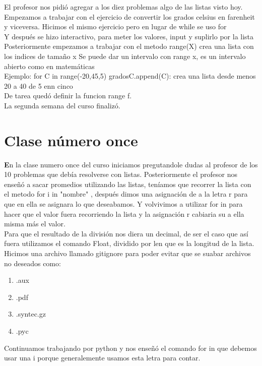 \documentclass{book}
\begin{document}
\begin{enumerate}
\begin{enumerate}
El profesor nos pidió agregar a los diez problemas algo de las listas visto hoy.\\
Empezamos a trabajar con el ejercicio de convertir los grados celsius en farenheit y viceversa. Hicimos el mismo ejercicio pero en lugar de while se uso for \\
Y después se hizo interactivo, para meter los valores, input y suplirlo por la lista\\
Posteriormente empezamos a trabajar con el metodo range(X) crea una lista con los indices de tamaño x
Se puede dar un intervalo con range x, es un intervalo abierto como en matemáticas\\
Ejemplo: for C in range(-20,45,5) gradosC.append(C): crea una lista desde menos 20 a 40 de 5 enn cinco\\
De tarea quedó definir la funcion range f. \\
La segunda semana del curso finalizó.

\chapter{Clase número once}

\textbf En la clase numero once del curso iniciamos pregutandole dudas al profesor de los 10 problemas que debía resolverse con listas.
Posteriormente el profesor nos enseñó a sacar promedios utilizando las listas, teníamos que recorrer la lista con el metodo 	\color{blue}for i in "nombre" \color{black}, después dimos una asignación de a la letra r para que en ella se asignara lo que deseabamos. Y volvivimos a utilizar \color{blue} for in \color{black} para hacer que el valor fuera recorriendo la lista y la asignación r cabiaria su a ella misma más el valor.\\
Para que el resultado de la división nos diera un decimal, de ser el caso que así fuera utilizamos el comando \color{blue} Float, \color{black} dividido por \color{blue} len \color{black} que es la longitud de la lista.\\

Hicimos una archivo llamado \color{blue} gitignore \color{black}para poder evitar que se suabar archivos no deseados como:
\begin{enumerate}
	\item .aux 
	\item .pdf 
	\item.syntec.gz 
	\item .pyc
\end{enumerate}
Continuamos trabajando por python y nos enseñó el comando \color{blue} for in \color{black} que debemos usar una i porque generalemente usamos esta letra para contar.\\


\end{enumerate}
\end{enumerate}
\end{document}
